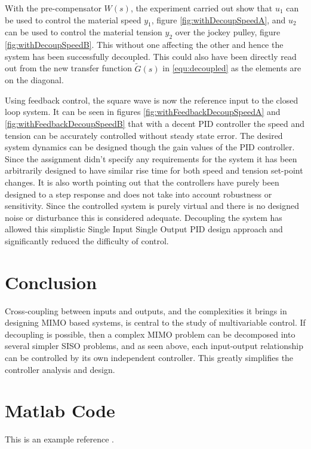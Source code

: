 \documentclass[a4paper, titlepage]{article}
\begin{document}
With the pre-compensator $W(s)$, the experiment carried out show that $u_1$ can be used to control the material speed $y_1$, figure \ref{fig:withDecoupSpeedA}, and $u_2$ can be used to control the material tension $y_2$ over the jockey pulley, figure \ref{fig:withDecoupSpeedB}.
This without one affecting the other and hence the system has been successfully decoupled.
This could also have been directly read out from the new transfer function $\tilde{G}(s)$ in \ref{equ:decoupled} as the elements are on the diagonal.

Using feedback control, the square wave is now the reference input to the closed loop system.
It can be seen in figures \ref{fig:withFeedbackDecoupSpeedA} and \ref{fig:withFeedbackDecoupSpeedB} that with a decent PID controller the speed and tension can be accurately controlled without steady state error.
The desired system dynamics can be designed though the gain values of the PID controller.
Since the assignment didn't specify any requirements for the system it has been arbitrarily designed to have similar rise time for both speed and tension set-point changes.
It is also worth pointing out that the controllers have purely been designed to a step response and does not take into account robustness or sensitivity.
Since the controlled system is purely virtual and there is no designed noise or disturbance this is considered adequate.
Decoupling the system has allowed this simplistic Single Input Single Output PID design approach and significantly reduced the difficulty of control.

\section{Conclusion}

Cross-coupling between inputs and outputs, and the complexities it brings in designing MIMO based systems, is central to the study of multivariable control.  
If decoupling is possible, then a complex MIMO problem can be decomposed into several simpler SISO problems, and as seen above, each input-output relationship can be controlled by its own independent controller.  This greatly simplifies the controller analysis and design.   

\clearpage


\clearpage
\appendix

\section{Matlab Code}
This is an example reference \citep{glad00}.
\end{document}

